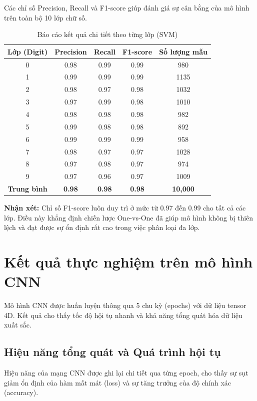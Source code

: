 \documentclass[../DoAn.tex]{subfiles}
\begin{document}
Các chỉ số Precision, Recall và F1-score giúp đánh giá sự cân bằng của mô hình trên toàn bộ 10 lớp chữ số.

\begin{table}[H]
\centering
\caption{Báo cáo kết quả chi tiết theo từng lớp (SVM)}
\label{tab:svm_report}
\begin{tabular}{|c|c|c|c|c|}
\hline
\textbf{Lớp (Digit)} & \textbf{Precision} & \textbf{Recall} & \textbf{F1-score} & \textbf{Số lượng mẫu} \\ \hline
0 & 0.98 & 0.99 & 0.99 & 980 \\ \hline
1 & 0.99 & 0.99 & 0.99 & 1135 \\ \hline
2 & 0.98 & 0.97 & 0.98 & 1032 \\ \hline
3 & 0.97 & 0.99 & 0.98 & 1010 \\ \hline
4 & 0.98 & 0.98 & 0.98 & 982 \\ \hline
5 & 0.99 & 0.98 & 0.98 & 892 \\ \hline
6 & 0.99 & 0.99 & 0.99 & 958 \\ \hline
7 & 0.98 & 0.97 & 0.97 & 1028 \\ \hline
8 & 0.97 & 0.98 & 0.97 & 974 \\ \hline
9 & 0.97 & 0.96 & 0.97 & 1009 \\ \hline
\hline
\textbf{Trung bình} & \textbf{0.98} & \textbf{0.98} & \textbf{0.98} & \textbf{10,000} \\ \hline
\end{tabular}
\end{table}

\textbf{Nhận xét:} Chỉ số F1-score luôn duy trì ở mức từ 0.97 đến 0.99 cho tất cả các lớp. Điều này khẳng định chiến lược One-vs-One đã giúp mô hình không bị thiên lệch và đạt được sự ổn định rất cao trong việc phân loại đa lớp.

\section{Kết quả thực nghiệm trên mô hình CNN}

Mô hình CNN được huấn luyện thông qua 5 chu kỳ (epochs) với dữ liệu tensor 4D. Kết quả cho thấy tốc độ hội tụ nhanh và khả năng tổng quát hóa dữ liệu xuất sắc.

\subsection{Hiệu năng tổng quát và Quá trình hội tụ}

Hiệu năng của mạng CNN được ghi lại chi tiết qua từng epoch, cho thấy sự sụt giảm ổn định của hàm mất mát (loss) và sự tăng trưởng của độ chính xác (accuracy).
\end{document}
